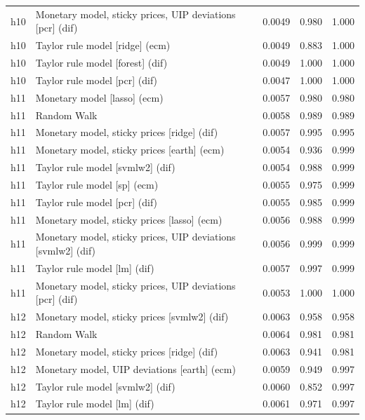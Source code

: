 \begin{ThreePartTable}
\begin{longtable}[t]{cp{5.5cm}ccc}
h10 & \raggedright Monetary model, sticky prices, UIP deviations [pcr] (dif) & 0.0049 & 0.980 & 1.000\\
h10 & \raggedright Taylor rule model [ridge] (ecm) & 0.0049 & 0.883 & 1.000\\
h10 & \raggedright Taylor rule model [forest] (dif) & 0.0049 & 1.000 & 1.000\\
h10 & \raggedright Taylor rule model [pcr] (dif) & 0.0047 & 1.000 & 1.000\\
\addlinespace
h11 & \raggedright Monetary model [lasso] (ecm) & 0.0057 & 0.980 & 0.980\\
h11 & \raggedright Random Walk & 0.0058 & 0.989 & 0.989\\
h11 & \raggedright Monetary model, sticky prices [ridge] (dif) & 0.0057 & 0.995 & 0.995\\
h11 & \raggedright Monetary model, sticky prices [earth] (ecm) & 0.0054 & 0.936 & 0.999\\
h11 & \raggedright Taylor rule model [svmlw2] (dif) & 0.0054 & 0.988 & 0.999\\
h11 & \raggedright Taylor rule model [sp] (ecm) & 0.0055 & 0.975 & 0.999\\
h11 & \raggedright Taylor rule model [pcr] (dif) & 0.0055 & 0.985 & 0.999\\
h11 & \raggedright Monetary model, sticky prices [lasso] (ecm) & 0.0056 & 0.988 & 0.999\\
h11 & \raggedright Monetary model, sticky prices, UIP deviations [svmlw2] (dif) & 0.0056 & 0.999 & 0.999\\
h11 & \raggedright Taylor rule model [lm] (dif) & 0.0057 & 0.997 & 0.999\\
h11 & \raggedright Monetary model, sticky prices, UIP deviations [pcr] (dif) & 0.0053 & 1.000 & 1.000\\
\addlinespace
h12 & \raggedright Monetary model, sticky prices [svmlw2] (dif) & 0.0063 & 0.958 & 0.958\\
h12 & \raggedright Random Walk & 0.0064 & 0.981 & 0.981\\
h12 & \raggedright Monetary model, sticky prices [ridge] (dif) & 0.0063 & 0.941 & 0.981\\
h12 & \raggedright Monetary model, UIP deviations [earth] (ecm) & 0.0059 & 0.949 & 0.997\\
h12 & \raggedright Taylor rule model [svmlw2] (dif) & 0.0060 & 0.852 & 0.997\\
h12 & \raggedright Taylor rule model [lm] (dif) & 0.0061 & 0.971 & 0.997\\

\end{longtable}
\end{ThreePartTable}
